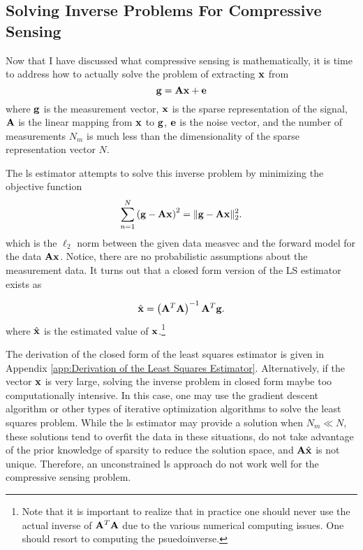 \subsection{Solving Inverse Problems For Compressive Sensing}

Now that I have discussed what compressive sensing is mathematically, it is time to address how to actually solve the problem of extracting $\mathbf{x}$ from
\begin{equation}
	\mathbf{g} = \mathbf{Ax} + \mathbf{e}
	\label{eq:gTan}
\end{equation}
where $\mathbf{g}$ is the measurement vector, $\mathbf{x}$ is the sparse representation of the signal, $\mathbf{A}$ is the linear mapping from $\mathbf{x}$ to $\mathbf{g}$, $\mathbf{e}$ is the noise vector, and the number of measurements $N_m$ is much less than the dimensionality of the sparse representation vector $N$. 


The \gls{ls} estimator attempts to solve this inverse problem by minimizing the objective function 
\begin{equation}
	\sum_{n=1}^{N} \left( \mathbf{g} - \mathbf{A}\mathbf{x} \right)^2 = \| \mathbf{g} - \mathbf{A}\mathbf{x} \|_{2}^{2}.
	\label{eq:lsObjFunc}
\end{equation}
which is the $\ell_2$ norm between the given data \gls{measvec} and the forward model for the data $\mathbf{A}\mathbf{x}$. Notice, there are no probabilistic assumptions about the measurement data. It turns out that a closed form version of the LS estimator exists as

\begin{equation}
	\hat{ \mathbf{x} } = \left( \mathbf{A}^T \mathbf{A} \right)^{-1} \mathbf{A}^T \mathbf{g}.
\end{equation}
where $\hat{ \mathbf{x} }$ is the estimated value of $\mathbf{x}$.\footnote{Note that it is important to realize that in practice one should never use the actual inverse of $\mathbf{A}^T \mathbf{A}$ due to the various numerical computing issues. One should resort to computing the psuedoinverse.}

The derivation of the closed form of the least squares estimator is given in Appendix \ref{app:Derivation of the Least Squares Estimator}. Alternatively, if the vector $\mathbf{x}$ is very large, solving the inverse problem in closed form maybe too computationally intensive. In this case, one may use the gradient descent algorithm or other types of iterative optimization algorithms to solve the least squares problem. While the \gls{ls} estimator may provide a solution when $N_m \ll N$, these solutions tend to overfit the data in these situations, do not take advantage of the prior knowledge of sparsity to reduce the solution space, and $\mathbf{A}\hat{ \mathbf{x} }$ is not unique. Therefore, an unconstrained \gls{ls} approach do not work well for the compressive sensing problem.


